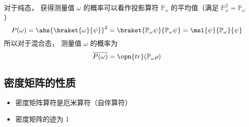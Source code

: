 对于纯态， 获得测量值 $\omega$ 的概率可以看作投影算符 $\mathbb P_\omega$ 的平均值（满足 $\mathbb P_\omega^2 = \mathbb P_\omega$）
\begin{equation}
P(\omega) = \abs{\braket{\omega}{\psi}}^2 = \braket{\mathbb P_\omega \psi}{\mathbb P_\omega \psi} = \mel{\psi}{\mathbb P_\omega}{\psi}
\end{equation}
所以对于混合态， 测量值 $\omega$ 的概率为
\begin{equation}
\overline{P(\omega)} = \opn{tr}(\mathbb P_\omega\rho)
\end{equation}

\subsection{密度矩阵的性质}
\begin{itemize}
\item 密度矩阵算符是厄米算符（自伴算符）

\item 密度矩阵的迹为 1
\end{itemize}
